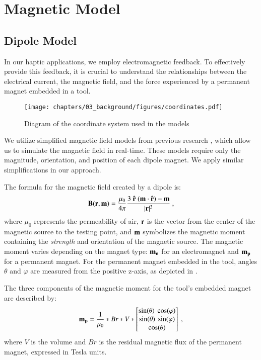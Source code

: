 \section{Magnetic Model}
\label{sc:back.mag}

\subsection{Dipole Model}
\label{sc:back.dipole}
In our haptic applications, we employ electromagnetic feedback. To effectively provide this feedback, it is crucial to understand the relationships between the electrical current, the magnetic field, and the force experienced by a permanent magnet embedded in a tool.

\begin{figure}
    \centering
    \texttt{[image: chapters/03\_background/figures/coordinates.pdf]}
    \caption{Diagram of the coordinate system used in the models}
    \label{fig:background:em_coordinates}
\end{figure}

We utilize simplified magnetic field models from previous research \cite{thomaszewski2008magnets}, which allow us to simulate the magnetic field in real-time. These models require only the magnitude, orientation, and position of each dipole magnet. We apply similar simplifications in our approach.

The formula for the magnetic field created by a dipole is:
\begin{equation}
    \mathbf{B} (\mathbf{r}, \mathbf{m})=\frac {\mu _{0}}{4\pi }\frac {3 \ \mathbf{\hat{r}} \ (\mathbf{m} \cdot \mathbf{\hat{r}}  )-\mathbf{m}}{|\mathbf{r} |^3} \ ,
    \label{eq:basic_B}
\end{equation}        
where $\mu_0$ represents the permeability of air, $\mathbf{r}$ is the vector from the center of the magnetic source to the testing point, and $\mathbf{m}$ symbolizes the magnetic moment containing the \emph{strength} and orientation of the magnetic source. The magnetic moment varies depending on the magnet type: $\mathbf{m_{e}}$ for an electromagnet and $\mathbf{m_p}$ for a permanent magnet. For the permanent magnet embedded in the tool, angles $\theta$ and $\varphi$ are measured from the positive z-axis, as depicted in .

The three components of the magnetic moment for the tool’s embedded magnet are described by:
\begin{equation}\label{eq:mpBold}
    \mpBold =  \frac{1}{\mu_0}*Br*V * \begin{bmatrix}\sin(\theta) \ \cos(\varphi)\\\sin(\theta) \ \sin(\varphi)\\\cos(\theta)\end{bmatrix}\ ,
\end{equation}
where $V$ is the volume and $Br$ is the residual magnetic flux of the permanent magnet, expressed in Tesla units.

